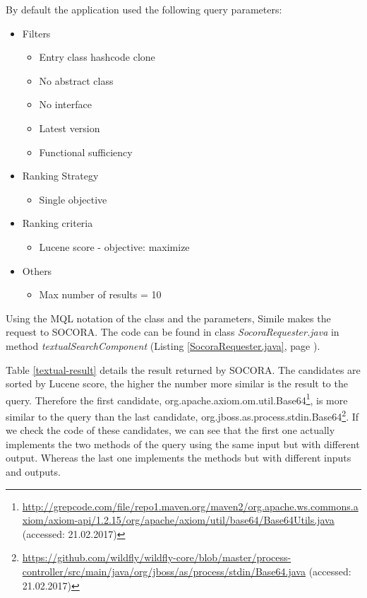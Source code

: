 By default the application used the following query parameters:

\begin{itemize}
\item Filters
	\begin{itemize}
	\item Entry class hashcode clone
	\item No abstract class
	\item No interface
	\item Latest version
	\item Functional sufficiency
	\end{itemize}
\item Ranking Strategy
	\begin{itemize}
	\item Single objective
	\end{itemize}
\item Ranking criteria
	\begin{itemize}
	\item Lucene score - objective: maximize
	\end{itemize}
\item Others
	\begin{itemize}
	\item Max number of results = 10
	\end{itemize}
\end{itemize}

Using the MQL notation of the class and the parameters, Simile makes the request to SOCORA. The code can be found in class \emph{SocoraRequester.java} in method \emph{textualSearchComponent} (Listing \ref{SocoraRequester.java}, page \pageref{SocoraRequester.java}). 

Table \ref{textual-result} details the result returned by SOCORA. The candidates are sorted by Lucene score, the higher the number more similar is the result to the query. Therefore the first candidate, org.apache.axiom.om.util.Base64\footnote{\url{http://grepcode.com/file/repo1.maven.org/maven2/org.apache.ws.commons.axiom/axiom-api/1.2.15/org/apache/axiom/util/base64/Base64Utils.java} (accessed: 21.02.2017)}, is more similar to the query than the last candidate, org.jboss.as.process.stdin.Base64\footnote{\url{https://github.com/wildfly/wildfly-core/blob/master/process-controller/src/main/java/org/jboss/as/process/stdin/Base64.java} (accessed: 21.02.2017)}. If we check the code of these candidates, we can see that the first one actually implements the two methods of the query using the same input but with different output. Whereas the last one implements the methods but with different inputs and outputs.

